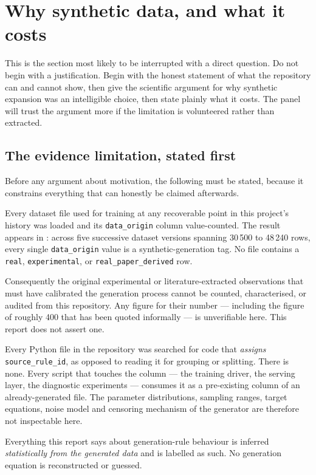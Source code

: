 \chapter{Why synthetic data, and what it costs}
\label{ch:synthetic}

\begin{saybox}[title=What to say at the start of this section]
This is the section most likely to be interrupted with a direct question.
Do not begin with a justification. Begin with the honest statement of what
the repository can and cannot show, then give the scientific argument for
why synthetic expansion was an intelligible choice, then state plainly
what it costs. The panel will trust the argument more if the limitation
is volunteered rather than extracted.
\end{saybox}

\section{The evidence limitation, stated first}
\label{sec:limit-evidence}

Before any argument about motivation, the following must be stated,
because it constrains everything that can honestly be claimed afterwards.

\begin{limitbox}[title=Limitation 1 --- the original experimental observations are not in this repository]
Every dataset file used for training at any recoverable point in this
project's history was loaded and its \texttt{data\_origin} column
value-counted. The result appears in : across
five successive dataset versions spanning 30\,500 to 48\,240 rows, every
single \texttt{data\_origin} value is a synthetic-generation tag. No file
contains a \texttt{real}, \texttt{experimental}, or
\texttt{real\_paper\_derived} row.

Consequently the original experimental or literature-extracted
observations that must have calibrated the generation process cannot be
counted, characterised, or audited from this repository. Any figure for
their number --- including the figure of roughly 400 that has been quoted
informally --- is unverifiable here. This report does not assert one.
\end{limitbox}

\begin{limitbox}[title=Limitation 2 --- the generation code is not in this repository]
Every Python file in the repository was searched for code that
\emph{assigns} \texttt{source\_rule\_id}, as opposed to reading it for
grouping or splitting. There is none. Every script that touches the column
--- the training driver, the serving layer, the diagnostic experiments ---
consumes it as a pre-existing column of an already-generated file. The
parameter distributions, sampling ranges, target equations, noise model and
censoring mechanism of the generator are therefore not inspectable here.

Everything this report says about generation-rule behaviour is inferred
\emph{statistically from the generated data} and is labelled as such. No
generation equation is reconstructed or guessed.
\end{limitbox}

